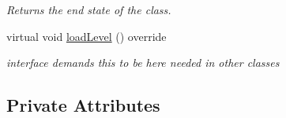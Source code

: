 \begin{DoxyCompactItemize}
\begin{DoxyCompactList}\small\item\em Returns the end state of the class. \end{DoxyCompactList}\item 
\mbox{\label{class_end_screen_aaca6fd16b77f8c78f8eb0f87aa6772ff}} 
virtual void \mbox{\hyperlink{class_end_screen_aaca6fd16b77f8c78f8eb0f87aa6772ff}{load\+Level}} () override
\begin{DoxyCompactList}\small\item\em interface demands this to be here needed in other classes \end{DoxyCompactList}\end{DoxyCompactItemize}
\subsection*{Private Attributes}
